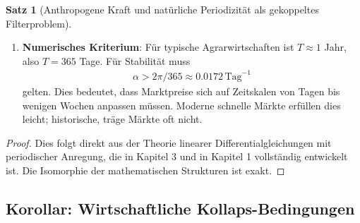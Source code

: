 \documentclass[a4paper, 12pt, twoside, openright]{report}
\theoremstyle{definition}
\theoremstyle{definition}
\newtheorem{satz}{Satz}[chapter]
\begin{document}
\begin{satz}[Anthropogene Kraft und natürliche Periodizität als gekoppeltes Filterproblem]
\begin{enumerate}
\item \textbf{Numerisches Kriterium}: Für typische Agrarwirtschaften ist $T \approx 1$ Jahr, also $T = 365$ Tage. Für Stabilität muss
\begin{align}
\alpha > 2\pi / 365 \approx 0.0172 \, \text{Tag}^{-1}
\end{align}
gelten. Dies bedeutet, dass Marktpreise sich auf Zeitskalen von Tagen bis wenigen Wochen anpassen müssen. Moderne schnelle Märkte erfüllen dies leicht; historische, träge Märkte oft nicht.

\end{enumerate}

\end{satz}

\begin{proof}

Dies folgt direkt aus der Theorie linearer Differentialgleichungen mit periodischer Anregung, die in Kapitel 3 und in \cite{epp_signal} Kapitel 1 vollständig entwickelt ist. Die Isomorphie der mathematischen Strukturen ist exakt.

\end{proof}

\subsection{Korollar: Wirtschaftliche Kollaps-Bedingungen}
\end{document}
